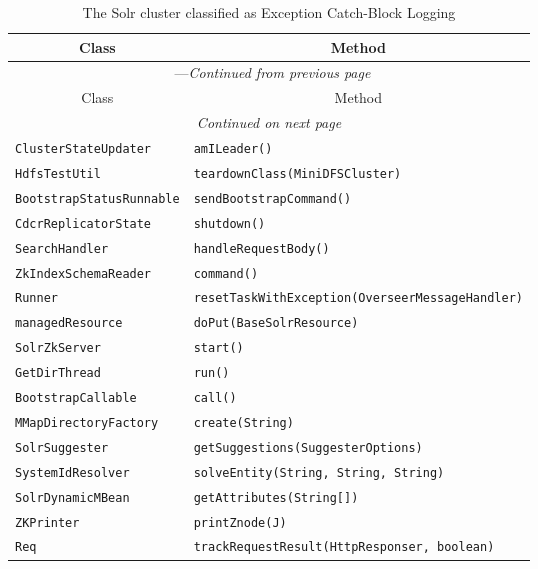 \begin{center}
\begin{longtable}{ll}
\caption{The Solr cluster classified as Exception Catch-Block Logging}\\
\toprule\multicolumn{1}{c}{Class}&\multicolumn{1}{c}{Method}\\\midrule
\endfirsthead

\multicolumn{2}{c}{\tablename\ \thetable{}---\textit{Continued from previous page}} \\\midrule
\multicolumn{1}{c}{Class}&\multicolumn{1}{c}{Method}\\\midrule
\endhead
\multicolumn{2}{c}{\textit{Continued on next page}}\\\midrule
\endfoot
\bottomrule
\endlastfoot

\lstinline/ClusterStateUpdater/&{\lstinline/amILeader()/}\\
\lstinline/HdfsTestUtil/&{\lstinline/teardownClass(MiniDFSCluster)/}\\
\lstinline/BootstrapStatusRunnable/&{\lstinline/sendBootstrapCommand()/}\\
\lstinline/CdcrReplicatorState/&{\lstinline/shutdown()/}\\
\lstinline/SearchHandler/&{\lstinline/handleRequestBody()/}\\
\lstinline/ZkIndexSchemaReader/&{\lstinline/command()/}\\
\lstinline/Runner/&{\lstinline/resetTaskWithException(OverseerMessageHandler)/}\\
\lstinline/managedResource/&{\lstinline/doPut(BaseSolrResource)/}\\
\lstinline/SolrZkServer/&{\lstinline/start()/}\\
\lstinline/GetDirThread/&{\lstinline/run()/}\\
\lstinline/BootstrapCallable/&{\lstinline/call()/}\\
\lstinline/MMapDirectoryFactory/&{\lstinline/create(String)/}\\
\lstinline/SolrSuggester/&{\lstinline/getSuggestions(SuggesterOptions)/}\\
\lstinline/SystemIdResolver/&{\lstinline/solveEntity(String, String, String)/}\\
\lstinline/SolrDynamicMBean/&{\lstinline/getAttributes(String[])/}\\
\lstinline/ZKPrinter/&{\lstinline/printZnode(J)/}\\
\lstinline/Req/&{\lstinline/trackRequestResult(HttpResponser, boolean)/}\\

\end{longtable}
\end{center}
